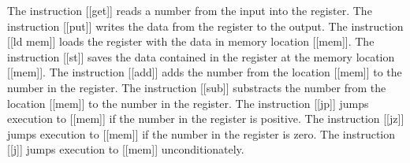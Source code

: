 \documentclass[a4paper,12pt]{article}
\begin{document}
The instruction [[get]] reads a number from the input into the
register. The instruction [[put]] writes the data from the register to
the output. The instruction [[ld mem]] loads the register with the data
in memory location [[mem]]. The instruction [[st]] saves the data
contained in the register at the memory location [[mem]]. The
instruction [[add]] adds the number from the location [[mem]] to the
number in the register. The instruction [[sub]] substracts the number
from the location [[mem]] to the number in the register. The instruction
[[jp]] jumps execution to [[mem]] if the number in the register is
positive. The instruction [[jz]] jumps execution to [[mem]] if the
number in the register is zero. The instruction [[j]] jumps execution to
[[mem]] unconditionately.
\end{document}
